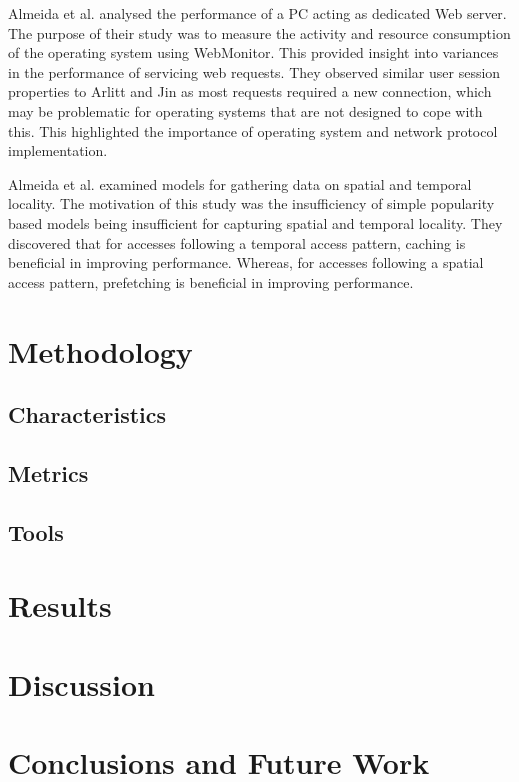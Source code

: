 \documentclass[10pt,conference]{IEEEtran}
\begin{document}
Almeida et al. \cite{almeida} analysed the performance of a PC acting as dedicated Web server. The purpose of their study was to measure the activity and resource consumption of the operating system using WebMonitor. This provided insight into variances in the performance of servicing web requests. They observed similar user session properties to Arlitt and Jin \cite{world_cup} as most requests required a new connection, which may be problematic for operating systems that are not designed to cope with this. This highlighted the importance of operating system and network protocol implementation.

Almeida et al. \cite{reference_locality} examined models for gathering data on spatial and temporal locality. The motivation of this study was the insufficiency of simple popularity based models being insufficient for capturing spatial and temporal locality. They discovered that for accesses following a temporal access pattern, caching is beneficial in improving performance. Whereas, for accesses following a spatial access pattern, prefetching is beneficial in improving performance.

\section{Methodology}\label{methodology}
\subsection{Characteristics}
\subsection{Metrics}
\subsection{Tools}

\section{Results}\label{results}

\section{Discussion}\label{discussion}

\section{Conclusions and Future Work}\label{conclusions}



\end{document}
